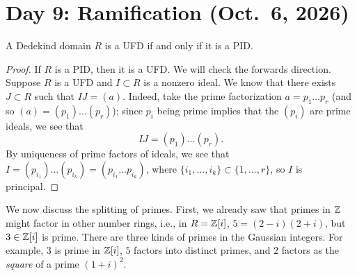 \section{Day 9: Ramification (Oct.\ 6, 2026)}
\begin{theorem} \label{thm:dedekind_ufd_equiv_pid}
    A Dedekind domain $R$ is a UFD if and only if it is a PID. 
\end{theorem}
\begin{proof}
    If $R$ is a PID, then it is a UFD. We will check the forwards direction. Suppose $R$ is a UFD and $I \subset R$ is a nonzero ideal. We know that there exists $J \subset R$ such that $IJ = (a)$. Indeed, take the prime factorization $a = p_1 \dots p_r$ (and so $(a) = (p_1) \dots (p_r)$); since $p_i$ being prime implies that the $(p_i)$ are prime ideals, we see that
    \[ IJ = (p_1) \dots (p_r). \]
    By uniqueness of prime factors of ideals, we see that $I = (p_{i_1}) \dots (p_{i_k}) = (p_{i_1} \dots p_{i_k})$, where $\{i_1, \dots, i_k\} \subset \{1, \dots, r\}$, so $I$ is principal.
\end{proof}

We now discuss the splitting of primes. First, we already saw that primes in $\mathbb Z$ might factor in other number rings, i.e., in $R = \mathbb Z[i]$, $5 = (2 - i)(2 + i)$, but $3 \in \mathbb Z[i]$ is prime. There are three kinds of primes in the Gaussian integers. For example, $3$ is prime in $\mathbb Z[i]$, $5$ factors into distinct primes, and $2$ factors as the \textit{square} of a prime $(1 + i)^2$.

